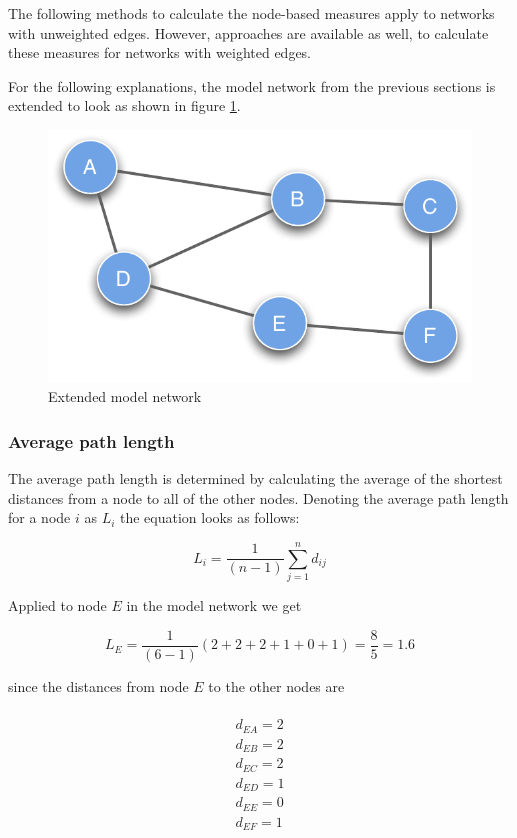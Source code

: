 The following methods to calculate the node-based measures apply to networks with unweighted edges. However, approaches are available as well, to calculate these measures for networks with weighted edges\citep{bocaletti:06}. 

For the following explanations, the model network from the previous sections is extended to look as shown in figure \ref{fig:extended_network}.

\clearpage

\begin{figure}[h!tpb]
\begin{center}
  \includegraphics[width=.45\textwidth]{assets/pdf/graph_undirected_node_based.pdf}
  \caption{Extended model network}
  \label{fig:extended_network}
\end{center}
\end{figure}   


\subsubsection{Average path length}

The average path length is determined by calculating the average of the shortest distances from a node to all of the other nodes. Denoting the average path length for a node $i$ as $L_i$ the equation looks as follows:

\begin{equation}
L_i = \frac{1}{(n-1)}\sum^n_{j=1} d_{ij}
\label{eq:average_path_lenght}
\end{equation}

Applied to node $E$ in the model network we get

\begin{equation}
L_E = \frac{1}{(6-1)}(2 + 2 + 2 + 1 + 0 + 1) = \frac{8}{5} = 1.6
\label{eq:average_path_lenght_e}
\end{equation}

since the distances from node $E$ to the other nodes are

\begin{multline} 
\\d_{EA} = 2 \\
d_{EB} = 2 \\
d_{EC} = 2 \\
d_{ED} = 1 \\
d_{EE} = 0 \\
d_{EF} = 1 \\
\label{eq:distances_e}
\end{multline}

